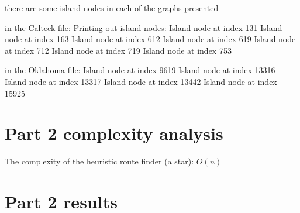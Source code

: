 \documentclass{article}
\begin{document}
there are some island nodes in each of the graphs presented

in the Calteck file:
Printing out island nodes:
Island node at index 131
Island node at index 163
Island node at index 612
Island node at index 619
Island node at index 712
Island node at index 719
Island node at index 753

in the Oklahoma file:
Island node at index 9619
Island node at index 13316
Island node at index 13317
Island node at index 13442
Island node at index 15925


\section{Part 2 complexity analysis}
\label{sec:complexity2}

The complexity of the heuristic route finder (a star):
$O(n)$


\section{Part 2 results}
\label{sec:part2}
\end{document}
